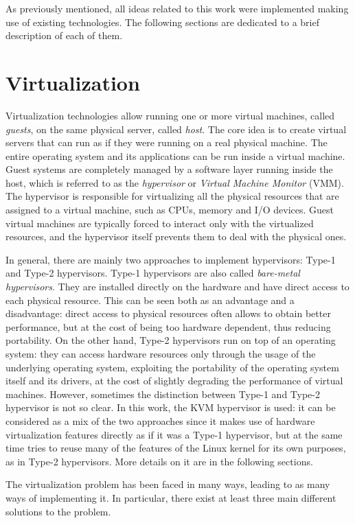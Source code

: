 As previously mentioned, all ideas related to this work were implemented making use of existing technologies. The following sections are dedicated to a brief description of each of them.  

\section{Virtualization}
Virtualization technologies allow running one or more virtual machines, called \emph{guests}, on the same physical server, called \emph{host}. The core idea is to create virtual servers that can run as if they were running on a real physical machine. The entire operating system and its applications can be run inside a virtual machine. Guest systems are completely managed by a software layer running inside the host, which is referred to as the \emph{hypervisor} or \emph{Virtual Machine Monitor} (VMM). The hypervisor is responsible for virtualizing all the physical resources that are assigned to a virtual machine, such as CPUs, memory and I/O devices. Guest virtual machines are typically forced to interact only with the virtualized resources, and the hypervisor itself prevents them to deal with the physical ones. 
\par In general, there are mainly two approaches to implement hypervisors: Type-1 and Type-2 hypervisors. Type-1 hypervisors are also called \emph{bare-metal hypervisors}. They are installed directly on the hardware and have direct access to each physical resource. This can be seen both as an advantage and a disadvantage: direct access to physical resources often allows to obtain better performance, but at the cost of being too hardware dependent, thus reducing portability. On the other hand, Type-2 hypervisors run on top of an operating system: they can access hardware resources only through the usage of the underlying operating system, exploiting the portability of the operating system itself and its drivers, at the cost of slightly degrading the performance of virtual machines. However, sometimes the distinction between Type-1 and Type-2 hypervisor is not so clear. In this work, the KVM hypervisor is used: it can be considered as a mix of the two approaches since it makes use of hardware virtualization features directly as if it was a Type-1 hypervisor, but at the same time tries to reuse many of the features of the Linux kernel for its own purposes, as in Type-2 hypervisors. More details on it are in the following sections. 
\par The virtualization problem has been faced in many ways, leading to as many ways of implementing it. In particular, there exist at least three main different solutions to the problem.
